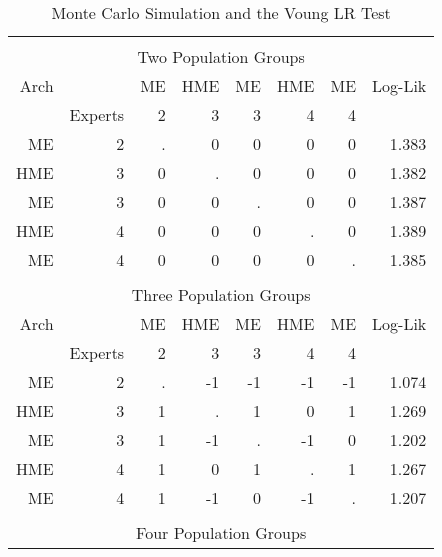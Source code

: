 \documentclass[12pt]{article}
\theoremstyle{definition}
\begin{document}
\begin{table}[t!] \centering
  \caption{Monte Carlo Simulation and the Voung LR Test}
  \begin{threeparttable}
    \begin{tabular}[l]{r r r r r r r r}
              &         &       &       &       &       &     &          \\
      \multicolumn{8}{c}{Two Population Groups}               \\
      \hline
      Arch    &         & ME    & HME   & ME    & HME   & ME  & Log-Lik  \\
              & Experts & 2     & 3     & 3     & 4     & 4   &          \\
              \hline
      ME      & 2       & .     & 0     & 0     & 0     & 0   & 1.383    \\
      HME     & 3       & 0     & .     & 0     & 0     & 0   & 1.382    \\
      ME      & 3       & 0     & 0     & .     & 0     & 0   & 1.387    \\
      HME     & 4       & 0     & 0     & 0     & .     & 0   & 1.389    \\
      ME      & 4       & 0     & 0     & 0     & 0     & .   & 1.385    \\
      \hline
              &         &       &       &       &       &     &         \\
      \multicolumn{8}{c}{Three Population Groups}            \\
      \hline
      Arch    &         & ME    & HME   & ME    & HME   & ME  & Log-Lik \\
              & Experts & 2     & 3     & 3     & 4     & 4   &         \\
              \hline
      ME      & 2       & .     & -1    & -1    & -1    & -1  & 1.074   \\
      HME     & 3       & 1     & .     & 1     & 0     & 1   & 1.269   \\
      ME      & 3       & 1     & -1    & .     & -1    & 0   & 1.202   \\
      HME     & 4       & 1     & 0     & 1     & .     & 1   & 1.267   \\
      ME      & 4       & 1     & -1    & 0     & -1    & .   & 1.207   \\
      \hline
              &         &       &       &       &       &     &         \\
      \multicolumn{8}{c}{Four Population Groups}             \\

\end{tabular}
\end{threeparttable}
\end{table}
\end{document}
